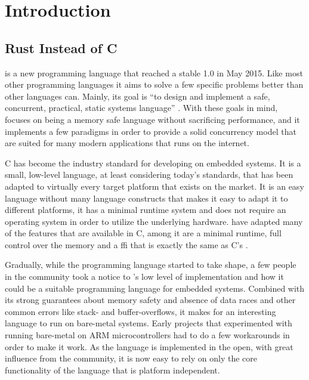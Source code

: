
\chapter{Introduction}
\label{chap:intro}


\section{Rust Instead of C} %
\label{sec:intro:rust_as_replacement_to_c}

{\rust} is a new programming language that reached a stable 1.0 in May 2015.
Like most other programming languages it aims to solve a few specific problems better than other languages can.
Mainly, its goal is ``to design and implement a safe, concurrent, practical, static systems language'' \cite{web:rust_faq}.
With these goals in mind, {\rust} focuses on being a memory safe language without sacrificing performance, and it implements a few paradigms in order to provide a solid concurrency model that are suited for many modern applications that runs on the internet.

C has become the industry standard for developing on embedded systems.
It is a small, low-level language, at least considering today's standards, that has been adapted to virtually every target platform that exists on the market.
It is an easy language without many language constructs that makes it easy to adapt it to different platforms, it has a minimal runtime system and does not require an operating system in order to utilize the underlying hardware.
{\rust} have adapted many of the features that are available in C, among it are a minimal runtime, full control over the memory and a \gls{ffi} that is exactly the same as C's \cite{web:rust_once_run_everywhere}.

Gradually, while the {\rust} programming language started to take shape, a few people in the community took a notice to {\rust}'s low level of implementation and how it could be a suitable programming language for embedded systems.
Combined with its strong guarantees about memory safety and absence of data races and other common errors like stack- and buffer-overflows, it makes for an interesting language to run on bare-metal systems.
Early projects that experimented with running {\rust} bare-metal on ARM microcontrollers had to do a few workarounds in order to make it work.
As the language is implemented in the open, with great influence from the community, it is now easy to rely on only the core functionality of the language that is platform independent.

